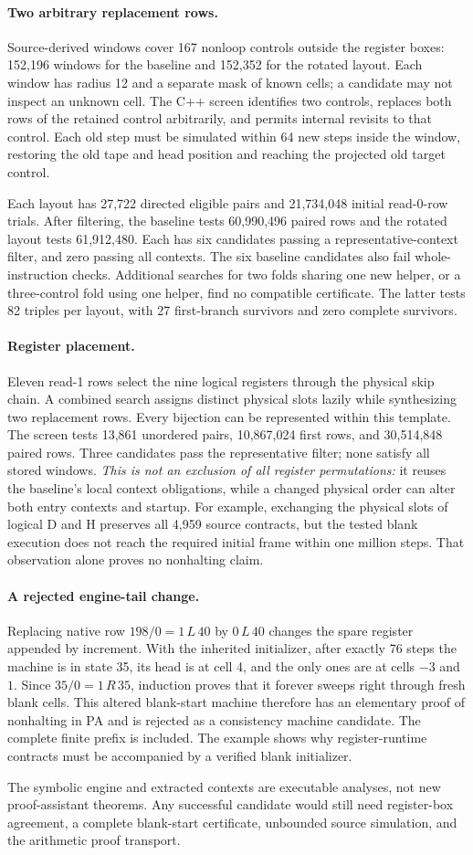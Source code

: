 \paragraph{Two arbitrary replacement rows.}
Source-derived windows cover 167 nonloop controls outside the register
boxes: 152,196 windows for the baseline and 152,352 for the rotated layout.
Each window has radius 12 and a separate mask of known cells; a candidate
may not inspect an unknown cell. The C++ screen identifies two controls,
replaces both rows of the retained control arbitrarily, and permits
internal revisits to that control. Each old step must be simulated within
64 new steps inside the window, restoring the old tape and head position
and reaching the projected old target control.

Each layout has 27,722 directed eligible pairs and 21,734,048 initial
read-0-row trials. After filtering, the baseline tests 60,990,496 paired
rows and the rotated layout tests 61,912,480. Each has six candidates
passing a representative-context filter, and zero passing all contexts.
The six baseline candidates also fail whole-instruction checks.
Additional searches for two folds sharing one new helper, or a
three-control fold using one helper, find no compatible certificate.
The latter tests 82 triples per layout, with 27 first-branch survivors
and zero complete survivors.

\paragraph{Register placement.}
Eleven read-1 rows select the nine logical registers through the physical
skip chain. A combined search assigns distinct physical slots lazily
while synthesizing two replacement rows. Every bijection can be
represented within this template. The screen tests 13,861 unordered pairs,
10,867,024 first rows, and 30,514,848 paired rows. Three candidates pass
the representative filter; none satisfy all stored windows.
\emph{This is not an exclusion of all register permutations:} it reuses
the baseline's local context obligations, while a changed physical order
can alter both entry contexts and startup. For example, exchanging the
physical slots of logical D and H preserves all 4,959 source contracts,
but the tested blank execution does not reach the required initial frame
within one million steps. That observation alone proves no nonhalting
claim.

\paragraph{A rejected engine-tail change.}
Replacing native row $198/0=1\,L\,40$ by $0\,L\,40$ changes the spare
register appended by increment. With the inherited initializer, after
exactly 76 steps the machine is in state 35, its head is at cell 4,
and the only ones are at cells $-3$ and $1$. Since
$35/0=1\,R\,35$, induction proves that it forever sweeps right through
fresh blank cells. This altered blank-start machine therefore has an
elementary proof of nonhalting in PA and is rejected as a consistency
machine candidate. The complete finite prefix is included. The example
shows why register-runtime contracts must be accompanied by a verified
blank initializer.

The symbolic engine and extracted contexts are executable analyses, not
new proof-assistant theorems. Any successful candidate would still need
register-box agreement, a complete blank-start certificate, unbounded
source simulation, and the arithmetic proof transport.
